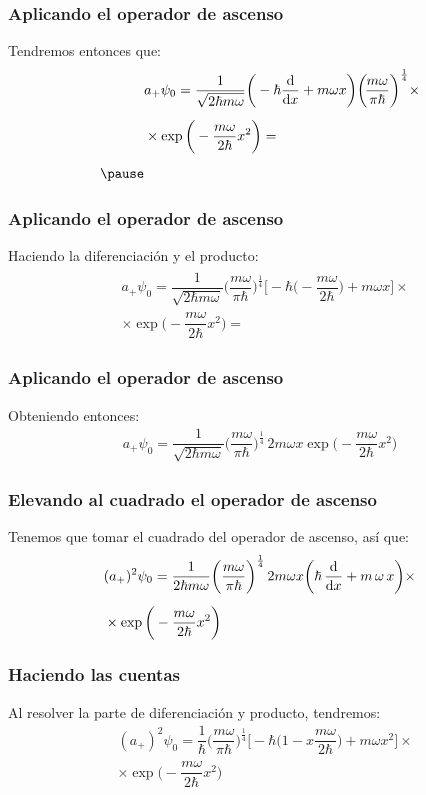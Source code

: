 \documentclass[12pt]{beamer}
\begin{document}
\begin{frame}
\frametitle{Aplicando el operador de ascenso}
Tendremos entonces que:
\pause
\begin{eqnarray*}
\begin{aligned}
&a_{+} \psi_{0} = \dfrac{1}{\sqrt{2 \hbar m \omega}} \bigg( - \hbar \dv{x} + m \omega x \bigg) \bigg( \! \dfrac{m \omega}{\pi \hbar} \bigg)^{\frac{1}{4}} \times \\[0.5em]
&\times \exp\bigg(- \dfrac{m \omega}{2 \hbar} x^{2} \bigg) = \\[0.5em] \pause
\end{aligned}
\end{eqnarray*}
\end{frame}
\begin{frame}
\frametitle{Aplicando el operador de ascenso}
Haciendo la diferenciación y el producto:
\pause
\begin{eqnarray*}
\begin{aligned}
&a_{+} \psi_{0} = \dfrac{1}{\sqrt{2 \hbar m \omega}} \bigg( \dfrac{m \omega}{\pi \hbar} \bigg)^{\frac{1}{4}} \bigg[ - \hbar \bigg( - \dfrac{m \omega}{2 \hbar} \bigg) {+} m \omega x \bigg] \times \\[0.5em]
&\times \exp\bigg(- \dfrac{m \omega}{2 \hbar} x^{2} \bigg) = 
\end{aligned}
\end{eqnarray*}
\end{frame}
\begin{frame}
\frametitle{Aplicando el operador de ascenso}
Obteniendo entonces:
\pause
\begin{align*}
a_{+} \psi_{0} = \dfrac{1}{\sqrt{2 \hbar m \omega}} \bigg( \dfrac{m \omega}{\pi \hbar} \bigg)^{\frac{1}{4}} \, 2 m \omega x \exp\bigg(- \dfrac{m \omega}{2 \hbar} x^{2} \bigg)
\end{align*}
\end{frame}
\begin{frame}
\frametitle{Elevando al cuadrado el operador de ascenso}
Tenemos que tomar el cuadrado del operador de ascenso, así que:
\pause
\begin{align*}
&(a_{+})^{2} \psi_{0} = \dfrac{1}{2 \hbar m \omega} \bigg( \dfrac{m \omega}{\pi \hbar} \bigg)^{\frac{1}{4}} \, 2 m \omega x \bigg( \hbar \, \dv{x} + m \, \omega \, x \bigg) \times \\[0.5em]
&\times \exp\bigg(- \dfrac{m \omega}{2 \hbar} x^{2} \bigg)
\end{align*}
\end{frame}
\begin{frame}
\frametitle{Haciendo las cuentas}
Al resolver la parte de diferenciación y producto, tendremos:
\pause
\begin{align*}
&(a_{+})^{2} \psi_{0} = \dfrac{1}{\hbar} \bigg( \dfrac{m \omega}{\pi \hbar} \bigg)^{\frac{1}{4}} \bigg[ - \hbar \bigg( 1 - x \dfrac{m \omega}{2 \hbar} \bigg) + m \omega x^{2} \bigg] \times \\[0.5em]
&\times \exp\bigg(- \dfrac{m \omega}{2 \hbar} x^{2} \bigg)
\end{align*}
\end{frame}
\end{document}
